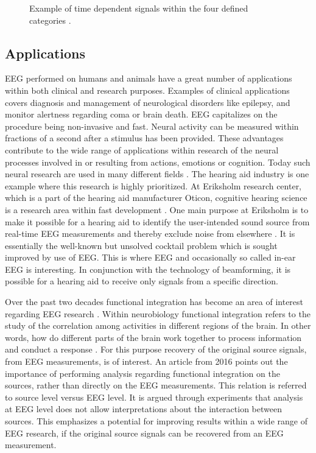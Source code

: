 \begin{figure}[H]
\begin{minipage}[t]{.45\textwidth}
        \caption{Example of time dependent signals within the four defined categories \cite{EEGsignalprocessing}.}\label{fig:EEG_example}
    \end{minipage}
\end{figure}
\noindent

\subsection{Applications}\label{seg:application}
EEG performed on humans and animals have a great number of applications within both clinical and research purposes. 
Examples of clinical applications covers diagnosis and management of neurological disorders like epilepsy, and monitor alertness regarding coma or brain death.
EEG capitalizes on the procedure being non-invasive and fast.
Neural activity can be measured within fractions of a second after a stimulus has been provided. 
These advantages contribute to the wide range of applications within research of the neural processes involved in or resulting from actions, emotions or cognition. Today such neural research are used in many different fields \cite[p. 4]{fundamentalEEG}.
The hearing aid industry is one example where this research is highly prioritized. 
At Eriksholm research center, which is a part of the hearing aid manufacturer Oticon, cognitive hearing science is a research area within fast development \cite{Weberik}. 
One main purpose at Eriksholm is to make it possible for a hearing aid to identify the user-intended sound source from real-time EEG measurements and thereby exclude noise from elsewhere \cite{Emina2019}\cite{Bech2018}. 
It is essentially the well-known but unsolved cocktail problem which is sought improved by use of EEG. 
This is where EEG and occasionally so called in-ear EEG is interesting. In conjunction with the technology of beamforming, it is possible for a hearing aid to receive only signals from a specific direction. 

Over the past two decades functional integration has become an area of interest regarding EEG research \cite{Friston2011}. 
Within neurobiology functional integration refers to the study of the correlation among activities in different regions of the brain. 
In other words, how do different parts of the brain work together to process information and conduct a response \cite{Friston2002}. 
For this purpose recovery of the original source signals, from EEG measurements, is of interest. 
An article from 2016 \cite{Van2019} points out the importance of performing analysis regarding functional integration on the sources, rather than directly on the EEG measurements. This relation is referred to source level versus EEG level. 
It is argued through experiments that analysis at EEG level does not allow interpretations about the interaction between sources. 
This emphasizes a potential for improving results within a wide range of EEG research, if the original source signals can be recovered from an EEG measurement.    


